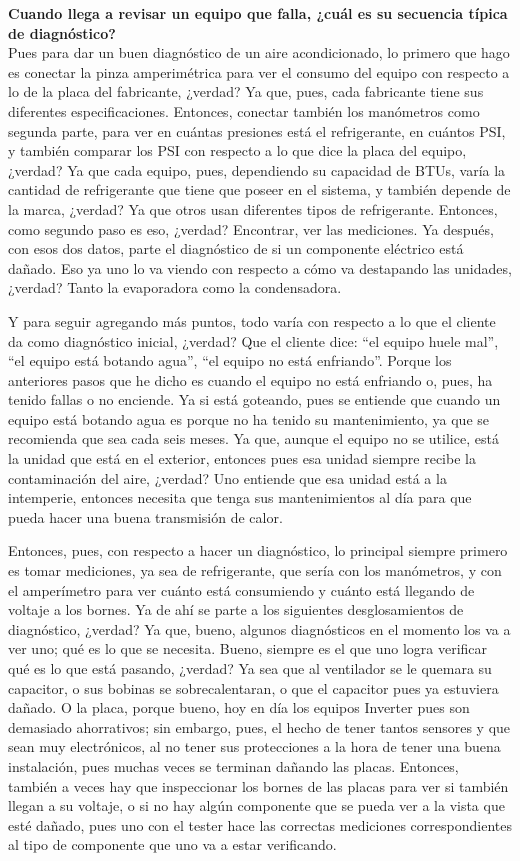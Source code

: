 {{    \textbf{Cuando llega a revisar un equipo que falla, ¿cuál es su secuencia típica de diagnóstico?}\\
    Pues para dar un buen diagnóstico de un aire acondicionado, lo primero que hago es conectar la pinza amperimétrica para ver el consumo del equipo con respecto a lo de la placa del fabricante, ¿verdad? Ya que, pues, cada fabricante tiene sus diferentes especificaciones. Entonces, conectar también los manómetros como segunda parte, para ver en cuántas presiones está el refrigerante, en cuántos PSI, y también comparar los PSI con respecto a lo que dice la placa del equipo, ¿verdad? Ya que cada equipo, pues, dependiendo su capacidad de BTUs, varía la cantidad de refrigerante que tiene que poseer en el sistema, y también depende de la marca, ¿verdad? Ya que otros usan diferentes tipos de refrigerante. Entonces, como segundo paso es eso, ¿verdad? Encontrar, ver las mediciones. Ya después, con esos dos datos, parte el diagnóstico de si un componente eléctrico está dañado. Eso ya uno lo va viendo con respecto a cómo va destapando las unidades, ¿verdad? Tanto la evaporadora como la condensadora.

    Y para seguir agregando más puntos, todo varía con respecto a lo que el cliente da como diagnóstico inicial, ¿verdad? Que el cliente dice: ``el equipo huele mal'', ``el equipo está botando agua'', ``el equipo no está enfriando''. Porque los anteriores pasos que he dicho es cuando el equipo no está enfriando o, pues, ha tenido fallas o no enciende. Ya si está goteando, pues se entiende que cuando un equipo está botando agua es porque no ha tenido su mantenimiento, ya que se recomienda que sea cada seis meses. Ya que, aunque el equipo no se utilice, está la unidad que está en el exterior, entonces pues esa unidad siempre recibe la contaminación del aire, ¿verdad? Uno entiende que esa unidad está a la intemperie, entonces necesita que tenga sus mantenimientos al día para que pueda hacer una buena transmisión de calor.

    Entonces, pues, con respecto a hacer un diagnóstico, lo principal siempre primero es tomar mediciones, ya sea de refrigerante, que sería con los manómetros, y con el amperímetro para ver cuánto está consumiendo y cuánto está llegando de voltaje a los bornes. Ya de ahí se parte a los siguientes desglosamientos de diagnóstico, ¿verdad? Ya que, bueno, algunos diagnósticos en el momento los va a ver uno; qué es lo que se necesita. Bueno, siempre es el que uno logra verificar qué es lo que está pasando, ¿verdad? Ya sea que al ventilador se le quemara su capacitor, o sus bobinas se sobrecalentaran, o que el capacitor pues ya estuviera dañado. O la placa, porque bueno, hoy en día los equipos Inverter pues son demasiado ahorrativos; sin embargo, pues, el hecho de tener tantos sensores y que sean muy electrónicos, al no tener sus protecciones a la hora de tener una buena instalación, pues muchas veces se terminan dañando las placas. Entonces, también a veces hay que inspeccionar los bornes de las placas para ver si también llegan a su voltaje, o si no hay algún componente que se pueda ver a la vista que esté dañado, pues uno con el tester hace las correctas mediciones correspondientes al tipo de componente que uno va a estar verificando.

}}
